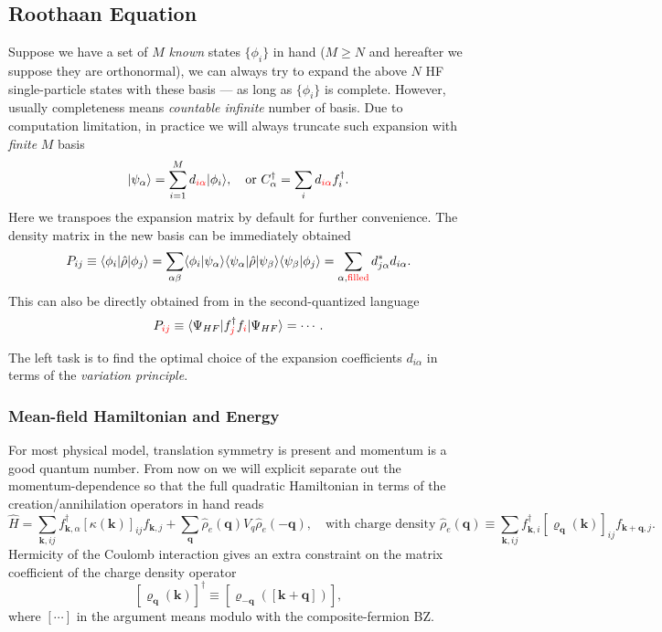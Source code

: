 \documentclass[aps,prb,nofootinbib,reprint,onecolumn]{revtex4-2}
\begin{document}
	\subsection{Roothaan Equation}
		Suppose we have a set of $M$ \emph{known} states $\{\phi_i\}$ in hand ($M\geq N$ and hereafter we suppose they are orthonormal), we can always try to expand the above $N$ HF single-particle states with these basis --- as long as $\{\phi_i\}$ is complete. However, usually completeness means \emph{countable infinite} number of basis. Due to computation limitation, in practice we will always truncate such expansion with \emph{finite} $M$ basis
		\begin{align*}
			|\psi_\alpha\rangle=\sum_{i=1}^M d_{\color{red}i \alpha }|\phi_i\rangle,\quad\text{or }C_\alpha^\dagger=\sum_i d_{\color{red}i \alpha} f_i^\dagger.
		\end{align*}
		Here we transpoes the expansion matrix by default for further convenience. The density matrix in the new basis can be immediately obtained
		\begin{equation*}
			P_{ij}\equiv\langle\phi_i|\hat\rho|\phi_j\rangle=\sum_{\alpha\beta}\langle\phi_i|\psi_\alpha\rangle\langle\psi_\alpha|\hat\rho|\psi_\beta\rangle\langle\psi_\beta|\phi_j\rangle=\sum_{\alpha,\text{\color{red}filled}} d_{j\alpha}^*d_{i\alpha}.
		\end{equation*}
		This can also be directly obtained from in the second-quantized language
		\begin{equation*}
			P_{\color{red}ij}\equiv\langle\Psi_{HF}| f_{{\color{red}j}}^\dagger f_{{\color{red}i}}|\Psi_{HF}\rangle=\cdots.
		\end{equation*}

		The left task is to find the optimal choice of the expansion coefficients $d_{i\alpha}$ in terms of the \emph{variation principle}.

			\subsubsection{Mean-field Hamiltonian and Energy}
				For most physical model, translation symmetry is present and momentum is a good quantum number. From now on we will explicit separate out the momentum-dependence so that the full quadratic Hamiltonian in terms of the creation/annihilation operators in hand reads
				\begin{equation}\label{full Hamiltonian}
					\hat H=\sum_{\bm k,ij} f_{\bm k,\alpha}^\dagger [\kappa(\bm k)]_{ij} f_{\bm k,j} + \sum_{\bm q}\hat\rho_e(\bm q)V_q\hat\rho_e(-\bm q),\quad\text{with charge density }\hat\rho_e(\bm q)\equiv\sum_{\bm k,ij}f_{\bm k,i}^\dagger [\varrho_{\bm q}(\bm k)]_{ij} f_{\bm{k+q},j}.
				\end{equation}
				Hermicity of the Coulomb interaction gives an extra constraint on the matrix coefficient of the charge density operator
				\begin{equation}\label{charge density matrix coefficient}
					[\varrho_{\bm q}(\bm k)]^\dagger\equiv[\varrho_{-\bm q}([\bm k+\bm q])],
				\end{equation}
				where $[\cdots]$ in the argument means modulo with the composite-fermion BZ.
\end{document}
